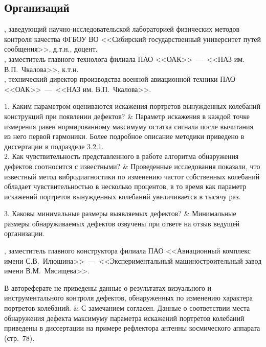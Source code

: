 \subsection{Организаций}

\begin{frame}
	\vspace{0.5em}
	, заведующий научно-исследовательской лабораторией физических методов контроля качества ФГБОУ ВО <<Сибирский государственный университет путей сообщения>>, д.т.н., доцент. \\
	, заместитель главного технолога филиала ПАО <<ОАК>>~---~<<НАЗ им. В.П.~Чкалова>>, к.т.н. \\
	, технический директор производства военной авиационной техники ПАО <<ОАК>>~---~<<НАЗ им. В.П.~Чкалова>>. \\
	\begin{comtblr}{12em}
		1. Каким параметром оцениваются искажения портретов вынужденных колебаний конструкций при появлении дефектов?
		& 
		Параметр искажения в каждой точке измерения равен нормированному максимуму остатка сигнала после вычитания из него первой гармоники. Более подробное описание методики приведено в диссертации в подразделе 3.2.1. \\
		2. Как чувствительность представленного в работе алгоритма обнаружения дефектов соотносится с известными? 
		&
		Проведенные исследования показали, что известный метод вибродиагностики по изменению частот собственных колебаний обладает чувствительностью в несколько процентов, в то время как параметр искажений портретов вынужденных колебаний увеличивается в тысячу раз.
	\end{comtblr}
\end{frame}

\begin{frame}
	\beginSkip
	\begin{comtblr}{12em}
		3. Каковы минимальные размеры выявляемых дефектов?
		&
		Минимальные размеры обнаруживаемых дефектов озвучены при ответе на отзыв ведущей организации. \\
	\end{comtblr}
\end{frame}

\begin{frame}
	\beginSkip
	, заместитель главного конструктора филиала ПАО <<Авиационный комплекс имени С.В.~Илюшина>>~---~<<Экспериментальный машиностроительный завод имени В.М.~Мясищева>>.
	\begin{comtblr}{}
		В автореферате не приведены данные о результатах визуального и инструментального контроля дефектов, обнаруженных по изменению характера портретов колебаний.
		& 
		С замечанием согласен. Данные о соответствии места обнаружения дефекта максимуму параметра искажений портретов колебаний приведены в диссертации на примере рефлектора антенны космического аппарата (стр.~78).
	\end{comtblr}
\end{frame}

